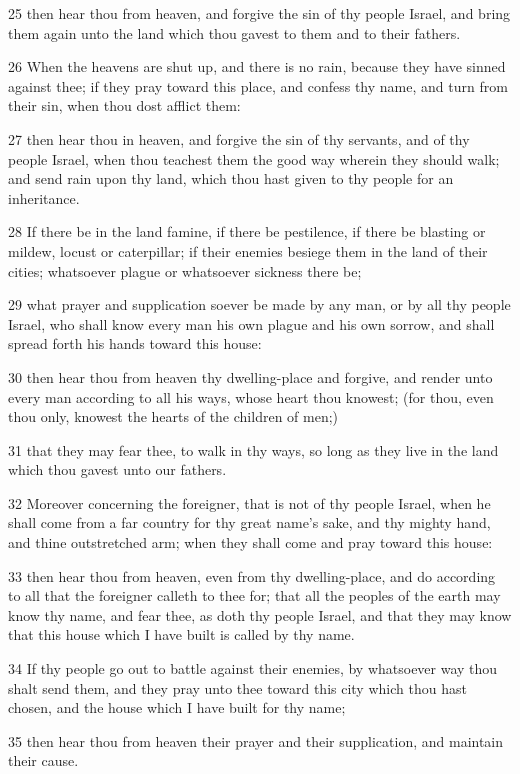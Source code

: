 \par 25 then hear thou from heaven, and forgive the sin of thy people Israel, and bring them again unto the land which thou gavest to them and to their fathers.
\par 26 When the heavens are shut up, and there is no rain, because they have sinned against thee; if they pray toward this place, and confess thy name, and turn from their sin, when thou dost afflict them:
\par 27 then hear thou in heaven, and forgive the sin of thy servants, and of thy people Israel, when thou teachest them the good way wherein they should walk; and send rain upon thy land, which thou hast given to thy people for an inheritance.
\par 28 If there be in the land famine, if there be pestilence, if there be blasting or mildew, locust or caterpillar; if their enemies besiege them in the land of their cities; whatsoever plague or whatsoever sickness there be;
\par 29 what prayer and supplication soever be made by any man, or by all thy people Israel, who shall know every man his own plague and his own sorrow, and shall spread forth his hands toward this house:
\par 30 then hear thou from heaven thy dwelling-place and forgive, and render unto every man according to all his ways, whose heart thou knowest; (for thou, even thou only, knowest the hearts of the children of men;)
\par 31 that they may fear thee, to walk in thy ways, so long as they live in the land which thou gavest unto our fathers.
\par 32 Moreover concerning the foreigner, that is not of thy people Israel, when he shall come from a far country for thy great name's sake, and thy mighty hand, and thine outstretched arm; when they shall come and pray toward this house:
\par 33 then hear thou from heaven, even from thy dwelling-place, and do according to all that the foreigner calleth to thee for; that all the peoples of the earth may know thy name, and fear thee, as doth thy people Israel, and that they may know that this house which I have built is called by thy name.
\par 34 If thy people go out to battle against their enemies, by whatsoever way thou shalt send them, and they pray unto thee toward this city which thou hast chosen, and the house which I have built for thy name;
\par 35 then hear thou from heaven their prayer and their supplication, and maintain their cause.
